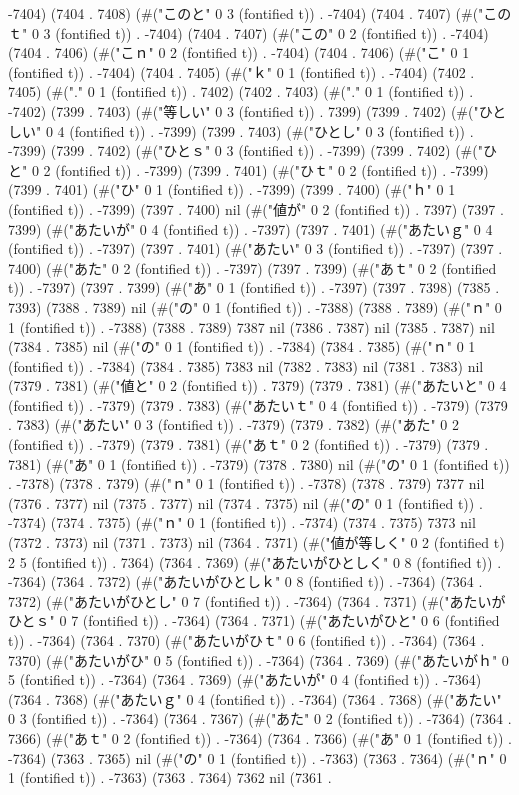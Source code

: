 -7404) (7404 . 7408) (#("このと" 0 3 (fontified t)) . -7404) (7404 . 7407) (#("このｔ" 0 3 (fontified t)) . -7404) (7404 . 7407) (#("この" 0 2 (fontified t)) . -7404) (7404 . 7406) (#("こｎ" 0 2 (fontified t)) . -7404) (7404 . 7406) (#("こ" 0 1 (fontified t)) . -7404) (7404 . 7405) (#("ｋ" 0 1 (fontified t)) . -7404) (7402 . 7405) (#("." 0 1 (fontified t)) . 7402) (7402 . 7403) (#("." 0 1 (fontified t)) . -7402) (7399 . 7403) (#("等しい" 0 3 (fontified t)) . 7399) (7399 . 7402) (#("ひとしい" 0 4 (fontified t)) . -7399) (7399 . 7403) (#("ひとし" 0 3 (fontified t)) . -7399) (7399 . 7402) (#("ひとｓ" 0 3 (fontified t)) . -7399) (7399 . 7402) (#("ひと" 0 2 (fontified t)) . -7399) (7399 . 7401) (#("ひｔ" 0 2 (fontified t)) . -7399) (7399 . 7401) (#("ひ" 0 1 (fontified t)) . -7399) (7399 . 7400) (#("ｈ" 0 1 (fontified t)) . -7399) (7397 . 7400) nil (#("値が" 0 2 (fontified t)) . 7397) (7397 . 7399) (#("あたいが" 0 4 (fontified t)) . -7397) (7397 . 7401) (#("あたいｇ" 0 4 (fontified t)) . -7397) (7397 . 7401) (#("あたい" 0 3 (fontified t)) . -7397) (7397 . 7400) (#("あた" 0 2 (fontified t)) . -7397) (7397 . 7399) (#("あｔ" 0 2 (fontified t)) . -7397) (7397 . 7399) (#("あ" 0 1 (fontified t)) . -7397) (7397 . 7398) (7385 . 7393) (7388 . 7389) nil (#("の" 0 1 (fontified t)) . -7388) (7388 . 7389) (#("ｎ" 0 1 (fontified t)) . -7388) (7388 . 7389) 7387 nil (7386 . 7387) nil (7385 . 7387) nil (7384 . 7385) nil (#("の" 0 1 (fontified t)) . -7384) (7384 . 7385) (#("ｎ" 0 1 (fontified t)) . -7384) (7384 . 7385) 7383 nil (7382 . 7383) nil (7381 . 7383) nil (7379 . 7381) (#("値と" 0 2 (fontified t)) . 7379) (7379 . 7381) (#("あたいと" 0 4 (fontified t)) . -7379) (7379 . 7383) (#("あたいｔ" 0 4 (fontified t)) . -7379) (7379 . 7383) (#("あたい" 0 3 (fontified t)) . -7379) (7379 . 7382) (#("あた" 0 2 (fontified t)) . -7379) (7379 . 7381) (#("あｔ" 0 2 (fontified t)) . -7379) (7379 . 7381) (#("あ" 0 1 (fontified t)) . -7379) (7378 . 7380) nil (#("の" 0 1 (fontified t)) . -7378) (7378 . 7379) (#("ｎ" 0 1 (fontified t)) . -7378) (7378 . 7379) 7377 nil (7376 . 7377) nil (7375 . 7377) nil (7374 . 7375) nil (#("の" 0 1 (fontified t)) . -7374) (7374 . 7375) (#("ｎ" 0 1 (fontified t)) . -7374) (7374 . 7375) 7373 nil (7372 . 7373) nil (7371 . 7373) nil (7364 . 7371) (#("値が等しく" 0 2 (fontified t) 2 5 (fontified t)) . 7364) (7364 . 7369) (#("あたいがひとしく" 0 8 (fontified t)) . -7364) (7364 . 7372) (#("あたいがひとしｋ" 0 8 (fontified t)) . -7364) (7364 . 7372) (#("あたいがひとし" 0 7 (fontified t)) . -7364) (7364 . 7371) (#("あたいがひとｓ" 0 7 (fontified t)) . -7364) (7364 . 7371) (#("あたいがひと" 0 6 (fontified t)) . -7364) (7364 . 7370) (#("あたいがひｔ" 0 6 (fontified t)) . -7364) (7364 . 7370) (#("あたいがひ" 0 5 (fontified t)) . -7364) (7364 . 7369) (#("あたいがｈ" 0 5 (fontified t)) . -7364) (7364 . 7369) (#("あたいが" 0 4 (fontified t)) . -7364) (7364 . 7368) (#("あたいｇ" 0 4 (fontified t)) . -7364) (7364 . 7368) (#("あたい" 0 3 (fontified t)) . -7364) (7364 . 7367) (#("あた" 0 2 (fontified t)) . -7364) (7364 . 7366) (#("あｔ" 0 2 (fontified t)) . -7364) (7364 . 7366) (#("あ" 0 1 (fontified t)) . -7364) (7363 . 7365) nil (#("の" 0 1 (fontified t)) . -7363) (7363 . 7364) (#("ｎ" 0 1 (fontified t)) . -7363) (7363 . 7364) 7362 nil (7361 . 